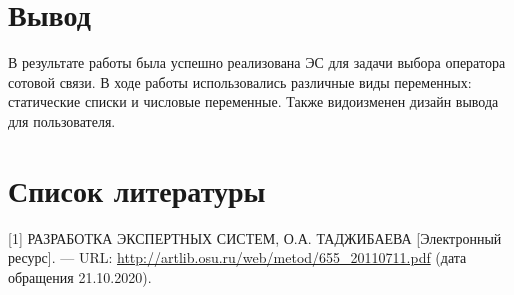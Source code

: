 \documentclass[14pt,a4paper,report]{report}
\begin{document}
\section{Вывод}

В результате работы была успешно реализована ЭС для задачи выбора оператора сотовой связи. В ходе работы использовались различные виды переменных: статические списки и числовые переменные. Также видоизменен дизайн вывода для пользователя.



\section{Список литературы}


\begin{flushleft}
	
[1] РАЗРАБОТКА ЭКСПЕРТНЫХ СИСТЕМ, О.А. ТАДЖИБАЕВА [Электронный ресурс]. — URL: \href{http://artlib.osu.ru/web/metod/655_20110711.pdf}{http://artlib.osu.ru/web/metod/655\_20110711.pdf} (дата обращения 21.10.2020). \linebreak

\end{flushleft}
	
\end{document}
